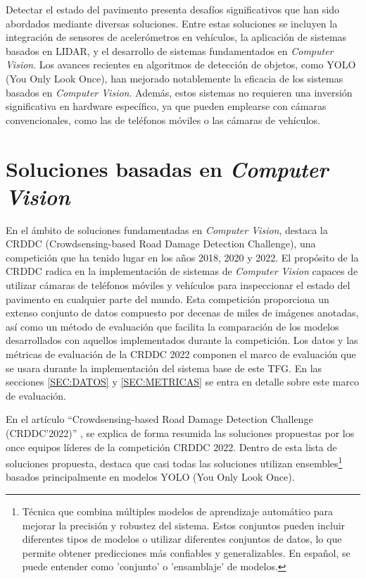 
Detectar el estado del pavimento presenta desafíos significativos que han sido abordados mediante diversas soluciones. Entre estas soluciones se incluyen la integración de sensores de acelerómetros en vehículos\cite{Pavement_Anomalies_Accelerometer}, la aplicación de sistemas basados en LIDAR\cite{LIDAR_Blasiis}\cite{LIDAR_VanDerHorst}, y el desarrollo de sistemas fundamentados en \textit{Computer Vision}. Los avances recientes en algoritmos de detección de objetos, como YOLO (You Only Look Once), han mejorado notablemente la eficacia de los sistemas basados en \textit{Computer Vision}. Además, estos sistemas no requieren una inversión significativa en hardware específico, ya que pueden emplearse con cámaras convencionales, como las de teléfonos móviles o las cámaras de vehículos.

\section{Soluciones basadas en \textit{Computer Vision}}
En el ámbito de soluciones fundamentadas en \textit{Computer Vision}, destaca la CRDDC (Crowdsensing-based Road Damage Detection Challenge), una competición que ha tenido lugar en los años 2018, 2020 y 2022. El propósito de la CRDDC radica en la implementación de sistemas de \textit{Computer Vision} capaces de utilizar cámaras de teléfonos móviles y vehículos para inspeccionar el estado del pavimento en cualquier parte del mundo. Esta competición proporciona un extenso conjunto de datos compuesto por decenas de miles de imágenes anotadas, así como un método de evaluación que facilita la comparación de los modelos desarrollados con aquellos implementados durante la competición. Los datos y las métricas de evaluación de la CRDDC 2022 componen el marco de evaluación que se usara durante la implementación del sistema base de este TFG. En las secciones \ref{SEC:DATOS} y \ref{SEC:METRICAS} se entra en detalle sobre este marco de evaluación.

En el artículo “Crowdsensing-based Road Damage Detection Challenge (CRDDC’2022)” \cite{CRDDC2022_paper}, se explica de forma resumida las soluciones propuestas por los once equipos líderes de la competición CRDDC 2022. Dentro de esta lista de soluciones propuesta, destaca que casi todas las soluciones utilizan ensembles\footnote{Técnica que combina múltiples modelos de aprendizaje automático para mejorar la precisión y robustez del sistema. Estos conjuntos pueden incluir diferentes tipos de modelos o utilizar diferentes conjuntos de datos, lo que permite obtener predicciones más confiables y generalizables. En español, se puede entender como 'conjunto' o 'ensamblaje' de modelos.} basados principalmente en modelos YOLO (You Only Look Once). 


